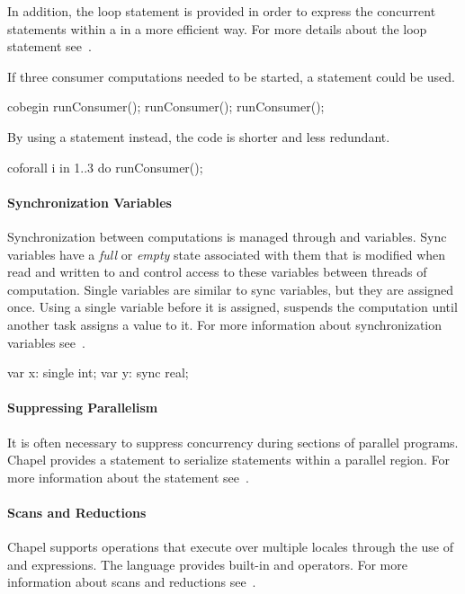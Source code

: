 In addition, the  loop statement is provided in
order to express the concurrent statements within a 
in a more efficient way.  For more details about the 
loop statement see~.

\begin{example}
If three consumer computations needed to be started, a 
statement could be used.
\begin{chapel}
cobegin {
  runConsumer();
  runConsumer();
  runConsumer();
}
\end{chapel}

By using a  statement instead, the code is shorter
and less redundant.

\begin{chapel}
coforall i in 1..3 do
  runConsumer();
\end{chapel}
\end{example}

\paragraph{Synchronization Variables}
Synchronization between computations is managed through
 and  variables.
Sync variables have a {\em full} or {\em empty} state associated
with them that is modified when read and written to and control
access to these variables between threads of computation.
Single variables are similar to sync variables, but they are assigned once.  
Using a single variable before it is assigned, 
suspends the computation until another task assigns a value to it.
For more information about synchronization variables 
see~.
\begin{chapel}
var x: single int;
var y: sync real;
\end{chapel}

\paragraph{Suppressing Parallelism}
It is often necessary to suppress concurrency during sections of
parallel programs.   Chapel provides a  statement
to serialize statements within a parallel region.  For more information
about the  statement see~.


\paragraph{Scans and Reductions}
Chapel supports operations that execute over multiple locales through
the use of  and  expressions.  The language
provides built-in  and  operators.  For more
information about scans and reductions see~.


